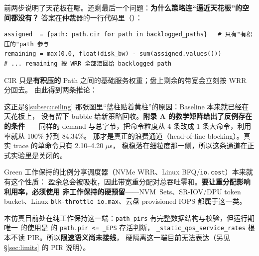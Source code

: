 \documentclass[UTF8,fontset=none,10pt,a4paper]{ctexart}
\newcommand{\code}[1]{\texttt{\small #1}}
\begin{document}
前两步说明了天花板在哪。还剩最后一个问题：\textbf{为什么策略连“逼近天花板”的空间都没有？}
答案在仲裁器的一行代码里（）：

\begin{lstlisting}[style=modernpython,numbers=none]
assigned  = {path: path.cir for path in backlogged_paths}   # 只有"有积压的"path 参与
remaining = max(0.0, float(disk_bw) - sum(assigned.values()))
# ... remaining 按 WRR 全部洒回给 backlogged path
\end{lstlisting}

CIR 只是\textbf{有积压的} Path 之间的基础服务权重；盘上剩余的带宽会立刻按 WRR 分回去。
由此得到两条推论：

\begin{center}
\end{center}

这正是\S\ref{subsec:ceiling} 那张图里“蓝柱贴着黄柱”的原因：Baseline 本来就已经在天花板上，
没有留下 bubble 给新策略回收。\textbf{附录 A 的教学矩阵给出了反例存在的条件}——同样的
demand 与总字节，把命令粒度从 4 条改成 1 条大命令，利用率就从 100\% 掉到 84.34\%。
那才是真正的浪费通道（head-of-line blocking）。真实 trace 的单命令只有 2.10--4.20 $\mu$s，
稳稳落在细粒度那一侧，所以这条通道在正式实验里是关闭的。

\begin{insightbox}[title={这不是仿真的 bug，而是一类调度器的真实性质}]{Green}
工作保持的比例分享调度器（NVMe WRR、Linux BFQ/\code{io.cost}）本来就有这个性质：
盈余总会被吸收，因此带宽重分配对总吞吐零和。\textbf{要让重分配影响利用率，必须使用
非工作保持的硬预留}——NVM~Sets、SR-IOV/DPU token bucket、Linux \code{blk-throttle
io.max}、云盘 provisioned IOPS 都属于这一类。\par\smallskip
本仿真目前处在纯工作保持这一端：\code{path\_pirs} 有完整数据结构与校验，但运行期唯一
的使用是  的 \code{path.pir <= \_EPS} 存活判断，
\code{\_static\_qos\_service\_rates} 根本不读 PIR。所以\textbf{限速语义尚未接线}，
硬隔离这一端目前无法表达（另见 \S\ref{sec:limits} 的 PIR 说明）。
\end{insightbox}
\end{document}
